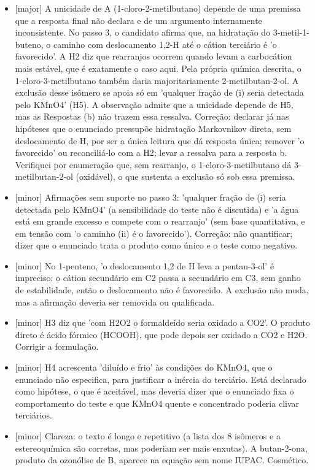 \documentclass{article}%
\begin{document}
\begin{itemize}%
\item%
{[}major{]} A unicidade de A (1{-}cloro{-}2{-}metilbutano) depende de uma premissa que a resposta final não declara e de um argumento internamente inconsistente. No passo 3, o candidato afirma que, na hidratação do 3{-}metil{-}1{-}buteno, o caminho com deslocamento 1,2{-}H até o cátion terciário é 'o favorecido'. A H2 diz que rearranjos ocorrem quando levam a carbocátion mais estável, que é exatamente o caso aqui. Pela própria química descrita, o 1{-}cloro{-}3{-}metilbutano também daria majoritariamente 2{-}metilbutan{-}2{-}ol. A exclusão desse isômero se apoia só em 'qualquer fração de (i) seria detectada pelo KMnO4' (H5). A observação admite que a unicidade depende de H5, mas as Respostas (b) não trazem essa ressalva. Correção: declarar já nas hipóteses que o enunciado pressupõe hidratação Markovnikov direta, sem deslocamento de H, por ser a única leitura que dá resposta única; remover 'o favorecido' ou reconciliá{-}lo com a H2; levar a ressalva para a resposta b. Verifiquei por enumeração que, sem rearranjo, o 1{-}cloro{-}3{-}metilbutano dá 3{-}metilbutan{-}2{-}ol (oxidável), o que sustenta a exclusão só sob essa premissa.%
\item%
{[}minor{]} Afirmações sem suporte no passo 3: 'qualquer fração de (i) seria detectada pelo KMnO4' (a sensibilidade do teste não é discutida) e 'a água está em grande excesso e compete com o rearranjo' (sem base quantitativa, e em tensão com 'o caminho (ii) é o favorecido'). Correção: não quantificar; dizer que o enunciado trata o produto como único e o teste como negativo.%
\item%
{[}minor{]} No 1{-}penteno, 'o deslocamento 1,2 de H leva a pentan{-}3{-}ol' é impreciso: o cátion secundário em C2 passa a secundário em C3, sem ganho de estabilidade, então o deslocamento não é favorecido. A exclusão não muda, mas a afirmação deveria ser removida ou qualificada.%
\item%
{[}minor{]} H3 diz que 'com H2O2 o formaldeído seria oxidado a CO2'. O produto direto é ácido fórmico (HCOOH), que pode depois ser oxidado a CO2 e H2O. Corrigir a formulação.%
\item%
{[}minor{]} H4 acrescenta 'diluído e frio' às condições do KMnO4, que o enunciado não especifica, para justificar a inércia do terciário. Está declarado como hipótese, o que é aceitável, mas deveria dizer que o enunciado fixa o comportamento do teste e que KMnO4 quente e concentrado poderia clivar terciários.%
\item%
{[}minor{]} Clareza: o texto é longo e repetitivo (a lista dos 8 isômeros e a estereoquímica são corretas, mas poderiam ser mais enxutas). A butan{-}2{-}ona, produto da ozonólise de B, aparece na equação sem nome IUPAC. Cosmético.%
\end{itemize}%
\end{document}
